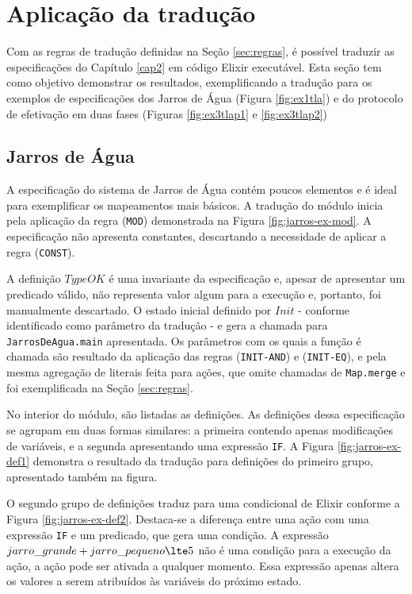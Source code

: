 \section{Aplicação da tradução}
\label{sec:validacao}

Com as regras de tradução definidas na Seção \ref{sec:regras}, é possível
traduzir as especificações do Capítulo \ref{cap2} em código Elixir executável.
Esta seção tem como objetivo demonstrar os resultados, exemplificando a tradução
para os exemplos de especificações dos Jarros de Água (Figura \ref{fig:ex1tla})
e do protocolo de efetivação em duas fases (Figuras \ref{fig:ex3tlap1} e
\ref{fig:ex3tlap2})

\subsection{Jarros de Água}


A especificação do sistema de Jarros de Água contém poucos elementos e é ideal
para exemplificar os mapeamentos mais básicos. A tradução do módulo inicia pela
aplicação da regra (\texttt{MOD}) demonstrada na Figura \ref{fig:jarros-ex-mod}.
A especificação não apresenta constantes, descartando a necessidade de aplicar a
regra (\texttt{CONST}).

A definição $TypeOK$ é uma invariante da especificação e, apesar de apresentar
um predicado válido, não representa valor algum para a execução e, portanto, foi
manualmente descartado. O estado inicial definido por $Init$ - conforme identificado como
parâmetro da tradução - e gera a chamada para \texttt{JarrosDeAgua.main}
apresentada. Os parâmetros com os quais a função é chamada são resultado da
aplicação das regras (\texttt{INIT-AND}) e (\texttt{INIT-EQ}), e pela mesma
agregação de literais feita para ações, que omite chamadas de \texttt{Map.merge}
e foi exemplificada na Seção \ref{sec:regras}.

No interior do módulo, são listadas as definições. As definições dessa
especificação se agrupam em duas formas similares: a primeira contendo apenas
modificações de variáveis, e a segunda apresentando uma expressão \texttt{IF}. A
Figura \ref{fig:jarros-ex-def1} demonstra o resultado da tradução para
definições do primeiro grupo, apresentado também na figura.

O segundo grupo de definições traduz para uma condicional de Elixir conforme a
Figura \ref{fig:jarros-ex-def2}. Destaca-se a diferença entre uma ação com uma
expressão \texttt{IF} e um predicado, que gera uma condição. A expressão
$jarro\_grande + jarro\_pequeno \lte 5$ não é uma condição para a execução da
ação, a ação pode ser ativada a qualquer momento. Essa expressão apenas altera
os valores a serem atribuídos às variáveis do próximo estado.

